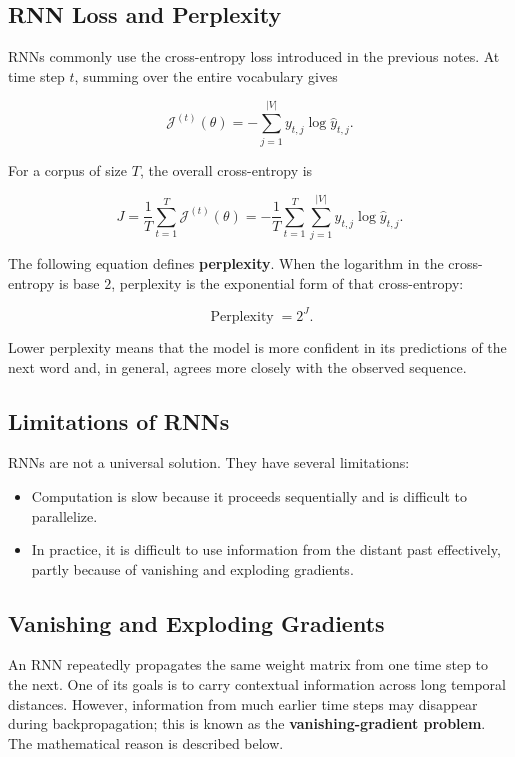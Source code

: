 \documentclass[
  a4paper,
  10pt]{article}
\providecommand{\tightlist}{%
  \setlength{\itemsep}{0pt}\setlength{\parskip}{0pt}}
\begin{document}
\subsection{RNN Loss and Perplexity}\label{rnn-loss-and-perplexity}

RNNs commonly use the cross-entropy loss introduced in the previous
notes. At time step \(t\), summing over the entire vocabulary gives

\[
\mathcal{J}^{(t)}(\theta)
=-\sum_{j=1}^{\lvert V\rvert}y_{t,j}\log\hat{y}_{t,j}.
\]

For a corpus of size \(T\), the overall cross-entropy is

\[
J
=\frac{1}{T}\sum_{t=1}^{T}\mathcal{J}^{(t)}(\theta)
=-\frac{1}{T}\sum_{t=1}^{T}\sum_{j=1}^{\lvert V\rvert}
y_{t,j}\log\hat{y}_{t,j}.
\]

The following equation defines \textbf{perplexity}. When the logarithm
in the cross-entropy is base \(2\), perplexity is the exponential form
of that cross-entropy:

\[
\operatorname{Perplexity}=2^J.
\]

Lower perplexity means that the model is more confident in its
predictions of the next word and, in general, agrees more closely with
the observed sequence.

\subsection{Limitations of RNNs}\label{limitations-of-rnns}

RNNs are not a universal solution. They have several limitations:

\begin{itemize}
\tightlist
\item
  Computation is slow because it proceeds sequentially and is difficult
  to parallelize.
\item
  In practice, it is difficult to use information from the distant past
  effectively, partly because of vanishing and exploding gradients.
\end{itemize}

\subsection{Vanishing and Exploding
Gradients}\label{vanishing-and-exploding-gradients}

An RNN repeatedly propagates the same weight matrix from one time step
to the next. One of its goals is to carry contextual information across
long temporal distances. However, information from much earlier time
steps may disappear during backpropagation; this is known as the
\textbf{vanishing-gradient problem}. The mathematical reason is
described below.
\end{document}
